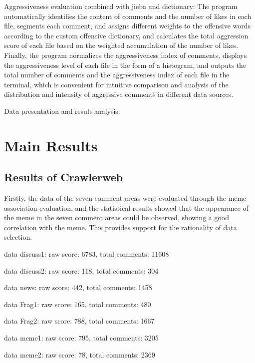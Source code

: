 \documentclass[12pt,a4paper]{ctexart}
\theoremstyle{MyLineTheoremStyle}
\theoremstyle{MyBlockTheoremStyle}
\theoremstyle{MySubsubsectionStyle}
\begin{document}
Aggressiveness evaluation combined with jieba and dictionary: The program automatically identifies the content of comments and the number of likes in each file, segments each comment, and assigns different weights to the offensive words according to the custom offensive dictionary, and calculates the total aggression score of each file based on the weighted accumulation of the number of likes. Finally, the program normalizes the aggressiveness index of comments, displays the aggressiveness level of each file in the form of a histogram, and outputs the total number of comments and the aggressiveness index of each file in the terminal, which is convenient for intuitive comparison and analysis of the distribution and intensity of aggressive comments in different data sources.

Data presentation and result analysis:%

\section{Main Results}


\subsection{Results of Crawlerweb}

Firstly, the data of the seven comment areas were evaluated through the meme association evaluation, and the statistical results showed that the appearance of the meme in the seven comment areas could be observed, showing a good correlation with the meme. This provides support for the rationality of data selection.

data discuss1: raw score: 6783, total comments: 11608

data discuss2: raw score: 118, total comments: 304

data news: raw score: 442, total comments: 1458

data Frag1: raw score: 165, total comments: 480

data Frag2: raw score: 788, total comments: 1667

data meme1: raw score: 795, total comments: 3205

data meme2: raw score: 78, total comments: 2369
\end{document}
